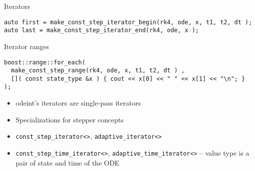\begin{frame}[fragile]


\vspace{2ex}

Iterators
\begin{lstlisting}[basicstyle=\tiny\ttfamily]
auto first = make_const_step_iterator_begin(rk4, ode, x, t1, t2, dt );
auto last = make_const_step_iterator_end(rk4, ode, x );
\end{lstlisting}

\vspace{2ex}

Iterator ranges
\begin{lstlisting}[basicstyle=\tiny\ttfamily]
boost::range::for_each(
  make_const_step_range(rk4, ode, x, t1, t2, dt ) ,
  []( const state_type &x ) { cout << x[0] << " " << x[1] << "\n"; } );
\end{lstlisting}




\vspace{2ex}

{\small
\begin{itemize}
\item odeint's iterators are single-pass iterators
\item Specializations for stepper concepts
\item {\tt const\_step\_iterator<>}, {\tt adaptive\_iterator<>}
\item {\tt const\_step\_time\_iterator<>}, {\tt adaptive\_time\_iterator<>} -- value type is a pair of state and time of the ODE
\end{itemize}
}



\end{frame}






